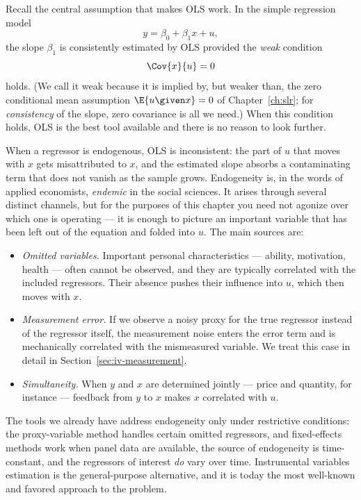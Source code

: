 Recall the central assumption that makes OLS work. In the simple regression model
\[
y = \beta_0 + \beta_1 x + u,
\]
the slope $\beta_1$ is consistently estimated by OLS provided the \emph{weak} condition
\[
\Cov{x}{u} = 0
\]
holds. (We call it weak because it is implied by, but weaker than, the zero conditional mean assumption $\E{u\given x}=0$ of Chapter~\ref{ch:slr}; for \emph{consistency} of the slope, zero covariance is all we need.) When this condition holds, OLS is the best tool available and there is no reason to look further.


When a regressor is endogenous, OLS is inconsistent: the part of $u$ that moves with $x$ gets misattributed to $x$, and the estimated slope absorbs a contaminating term that does not vanish as the sample grows. Endogeneity is, in the words of applied economists, \emph{endemic} in the social sciences. It arises through several distinct channels, but for the purposes of this chapter you need not agonize over which one is operating --- it is enough to picture an important variable that has been left out of the equation and folded into $u$. The main sources are:
\begin{itemize}
    \item \emph{Omitted variables.} Important personal characteristics --- ability, motivation, health --- often cannot be observed, and they are typically correlated with the included regressors. Their absence pushes their influence into $u$, which then moves with $x$.
    \item \emph{Measurement error.} If we observe a noisy proxy for the true regressor instead of the regressor itself, the measurement noise enters the error term and is mechanically correlated with the mismeasured variable. We treat this case in detail in Section~\ref{sec:iv-measurement}.
    \item \emph{Simultaneity.} When $y$ and $x$ are determined jointly --- price and quantity, for instance --- feedback from $y$ to $x$ makes $x$ correlated with $u$.
\end{itemize}

The tools we already have address endogeneity only under restrictive conditions: the proxy-variable method handles certain omitted regressors, and fixed-effects methods work when panel data are available, the source of endogeneity is time-constant, and the regressors of interest \emph{do} vary over time. Instrumental variables estimation is the general-purpose alternative, and it is today the most well-known and favored approach to the problem.

